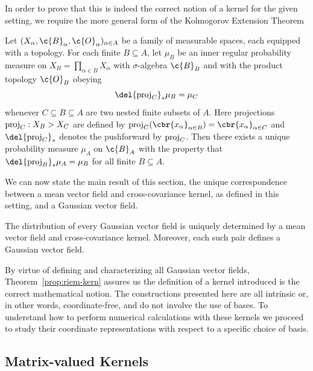 In order to prove that this is indeed the correct notion of a kernel for the given setting, we require the more general form of the Kolmogorov Extension Theorem \begin{result} \label{result:tao} Let $(X_\alpha,\c{B}_\alpha,\c{O}_\alpha)_{\alpha\in A}$ be a family of measurable spaces, each equipped with a topology.
	For each finite $B \subseteq A$, let $\mu_B$ be an inner regular probability measure on $X_B = \prod_{\alpha\in B} X_\alpha$ with $\sigma$-algebra $\c{B}_B$ and with the product topology $\c{O}_B$ obeying \[\label{project-measure} \del{\proj_C}_* \mu_B = \mu_C \] whenever $C \subseteq B \subseteq A$ are two nested finite subsets of $A$.
	Here projections $\operatorname{proj}_C: X_B \-> X_C$ are defined by $\proj_C(\cbr{x_\alpha}_{\alpha \in B}) = \cbr{x_\alpha}_{\alpha \in C}$ and $\del{\proj_C}_*$ denotes the pushforward by $\operatorname{proj}_{C}$.
	Then there exists a unique probability measure $\mu_A$ on $\c{B}_A$ with the property that $\del{\proj_B}_* \mu_A = \mu_B$ for all finite $B \subseteq A$.
\end{result}

We can now state the main result of this section, the unique correspondence between a mean vector field and cross-covariance kernel, as defined in this setting, and a Gaussian vector field.

\begin{theorem}
	\label{prop:riem-kern}
	The distribution of every Gaussian vector field is uniquely determined by a mean vector field and cross-covariance kernel.
	Moreover, each such pair defines a Gaussian vector field.
\end{theorem}

By virtue of defining and characterizing all Gaussian vector fields, Theorem~\ref{prop:riem-kern} assures us the definition of a kernel introduced is the correct mathematical notion.
The constructions presented here are all intrinsic or, in other words, coordinate-free, and do not involve the use of bases.
To understand how to perform numerical calculations with these kernels we proceed to study their coordinate representations with respect to a specific choice of basis.

\subsection{Matrix-valued Kernels}
\label{sec:gauge-equivariant-kernels}


